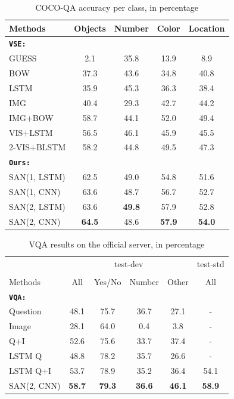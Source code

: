 \documentclass[10pt,twocolumn,letterpaper]{article}
\begin{document}
\begin{table}
      \centering
  \begin{tabular}{l  c  c  c  c}
    \toprule
    Methods & Objects & Number & Color & Location \\
    \midrule
    {\bf\texttt{VSE:}} \cite{ren2015imageqa} \\
    GUESS & 2.1 & 35.8 & 13.9 & 8.9 \\
    BOW & 37.3 & 43.6 & 34.8 & 40.8 \\
    LSTM & 35.9 & 45.3 & 36.3 & 38.4 \\
    IMG & 40.4 & 29.3 & 42.7 & 44.2 \\
    IMG+BOW & 58.7 & 44.1 & 52.0 & 49.4 \\
    VIS+LSTM & 56.5 & 46.1 & 45.9 & 45.5 \\
    2-VIS+BLSTM & 58.2 & 44.8 & 49.5 & 47.3 \\
    \midrule
    {\bf \texttt{Ours:}} \\
    SAN(1, LSTM) & 62.5 & 49.0 & 54.8 & 51.6 \\
    SAN(1, CNN) & 63.6 & 48.7 & 56.7 & 52.7 \\
    SAN(2, LSTM) & 63.6 & {\bf 49.8} & 57.9 & 52.8 \\
    SAN(2, CNN) & {\bf 64.5} & 48.6 & {\bf 57.9} & {\bf 54.0} \\
    \bottomrule
  \end{tabular}
  \caption{COCO-QA accuracy per class, in percentage}
  \label{tab:coco_perclass}
  \vspace{-0.5cm}
\end{table}

\begin{table}
  \centering
  \small
  \begin{tabular}{l c c c c c}
    \toprule
    & \multicolumn{4}{c}{test-dev} & test-std \\
    \cline{2-5}\\
    Methods & All & Yes/No & Number & Other & All\\
    \midrule
    {\bf\texttt{VQA:}} \cite{antol2015vqa} \\
    Question & 48.1 & 75.7 & 36.7 & 27.1 & - \\
    Image & 28.1 & 64.0 & 0.4 & 3.8 & -\\
    Q+I & 52.6 & 75.6 & 33.7 & 37.4 & -\\
    LSTM Q & 48.8 & 78.2 & 35.7 & 26.6 & -\\
    LSTM Q+I & 53.7 & 78.9 & 35.2 & 36.4 & 54.1 \\
    \midrule
    SAN(2, CNN) & {\bf 58.7} & {\bf 79.3} & {\bf 36.6} & {\bf 46.1} & {\bf 58.9}\\
    \bottomrule
  \end{tabular}
  \caption{VQA results on the official server, in percentage}
\label{tab:vqa_server}
\vspace{-0.6cm}
\end{table}
\end{document}
